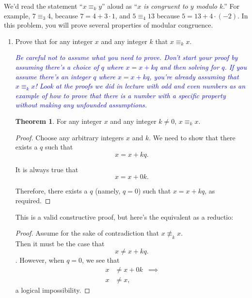\documentclass{article}
\renewcommand{\(}{\left(}
\renewcommand{\)}{\right)}
\theoremstyle{plain}
\theoremstyle{plain}
\theoremstyle{definition}
\newtheorem{theorem}{Theorem}[section]
\begin{document}
We'd read the statement ``$x \equiv_k y$'' aloud as ``\textit{$x$ is congruent to $y$ modulo $k$}.'' For example, $7 \equiv_3 4$, because $7 = 4 + 3 \cdot 1$, and $5 \equiv_4 13$ because $5 = 13 + 4 \cdot (-2)$. 
In this problem, you will prove several properties of modular congruence.

\begin{enumerate}[label*=\roman*.,ref=\roman*]

\item Prove that for any integer $x$ and any integer $k$ that $x \equiv_k x$.

\textit{\textcolor{blue}{Be careful not to assume what you need to prove. Don't start your proof by assuming there's a choice of $q$ where $x = x + kq$ and then solving for $q$. If you assume there's an integer $q$ where $x = x + kq$, you're already assuming that $x \equiv_k x$! Look at the proofs we did in lecture with odd and even numbers as an example of how to prove that there is a number with a specific property without making any unfounded assumptions.}}

\begin{shaded}

\begin{theorem}
	For any integer $x$ and any integer $k \neq 0$, $x \equiv_k x$.
\end{theorem}	
\begin{proof}
	Choose any arbitrary integers $x$ and $k$. We need to show that there exists a $q$ such that
	\begin{equation} \label{eq:21}
	x = x + kq.
	\end{equation}

	It is always true that
	\begin{equation}
	x = x + 0k.
	\end{equation}
	
	Therefore, there exists a $q$ (namely, $q=0$) such that $x = x + kq$, as required.
\end{proof}
This is a valid constructive proof, but here's the equivalent as a reductio:
\begin{proof}
	Assume for the sake of contradiction that $x \not\equiv_k x$. \\
	Then it must be the case that 
	\begin{equation} x \neq x + kq. 
	\end{equation}.
	However, when $q = 0$, we see that
	\begin{equation}
	\begin{aligned}
		x & \neq x + 0k & \implies \\
		x & \neq x,
	\end{aligned}
	\end{equation}
	a logical impossibility.
	

\end{proof}
\end{shaded}
\end{enumerate}
\end{document}
